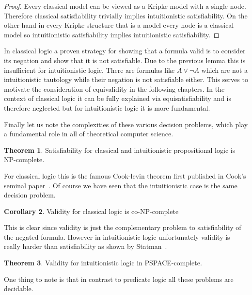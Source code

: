 \documentclass[a4paper,12pt]{report}
\theoremstyle{definition}
\newtheorem{theorem}{Theorem}[section]
\theoremstyle{definition}
\newtheorem{corollary}[theorem]{Corollary}
\theoremstyle{definition}
\theoremstyle{definition}
\theoremstyle{definition}
\theoremstyle{definition}
\theoremstyle{definition}
\begin{document}
	\begin{proof}
		Every classical model can be viewed as a Kripke model with a single node. Therefore classical satisfiability trivially implies intuitionistic satisfiability.	On the other hand in every Kripke structure that is a model every node is a classical model so intuitionistic satisfiability implies intuitionistic satisfiability.
	\end{proof}

	In classical logic a proven strategy for showing that a formula valid is to consider its negation and show that it is not satisfiable. Due to the previous lemma this is insufficient for intuitionistic logic. There are formulas like $A\vee\neg A$ which are not a intuitionistic tautology while their negation is not satisfiable either. This serves to motivate the consideration of equivalidity in the following chapters. In the context of classical logic it can be fully explained via equisatisfiability and is therefore neglected but for intuitionistic logic it is more fundamental.
	
	Finally let us note the complexities of these various decision problems, which play a fundamental role in all of theoretical computer science.
	
	\begin{theorem}
		Satisfiability for classical and intuitionistic propositional logic is NP-complete.
	\end{theorem}

	For classical logic this is the famous Cook-levin theorem first published in Cook's seminal paper~\cite{cook1971complexity}. Of course we have seen that the intuitionistic case is the same decision problem.
	
	\begin{corollary}
		Validity for classical logic is co-NP-complete
	\end{corollary}

	This is clear since validity is just the complementary problem to satisfiability of the negated formula. However in intuitionistic logic unfortunately validity is really harder than satisfiability as shown by Statman~\cite{statman1979intuitionistic}.
	
	\begin{theorem}
		Validity for intuitionistic logic in PSPACE-complete.
	\end{theorem}

	One thing to note is that in contrast to predicate logic all these problems are decidable.
	
\end{document}
